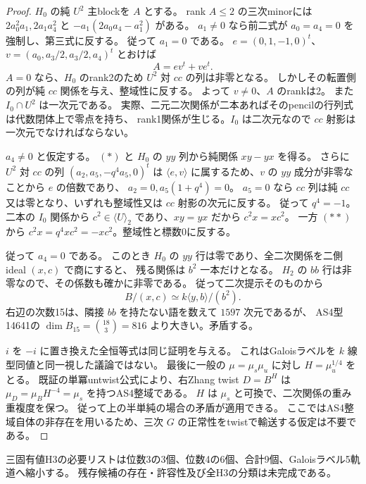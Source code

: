 \begin{proof}
$H_0$ の純 $U^2$ 主blockを $A$ とする。
rank $A\le2$ の三次minorには $2a_0^2a_1,2a_1a_4^2$ と
$-a_1(2a_0a_4-a_1^2)$ がある。
$a_1\ne0$ なら前二式が $a_0=a_4=0$ を強制し、第三式に反する。
従って $a_1=0$ である。
$e=(0,1,-1,0)^t$、$v=(a_0,a_3/2,a_3/2,a_4)^t$ とおけば
\[
 A=ev^t+ve^t.
\]
$A=0$ なら、$H_0$ のrank2のため $U^2$ 対 $cc$ の列は非零となる。
しかしその転置側の列が純 $cc$ 関係を与え、整域性に反する。
よって $v\ne0$、$A$ のrankは2。
また $I_0\cap U^2$ は一次元である。
実際、二元二次関係が二本あればそのpencilの行列式は代数閉体上で零点を持ち、
rank1関係が生じる。$I_0$ は二次元なので $cc$ 射影は一次元でなければならない。

$a_4\ne0$ と仮定する。
$(*)$ と $H_0$ の $yy$ 列から純関係 $xy-yx$ を得る。
さらに $U^2$ 対 $cc$ の列 $(a_2,a_5,-q^4a_5,0)^t$ は
$\langle e,v\rangle$ に属するため、$v$ の $yy$ 成分が非零なことから $e$ の倍数であり、
$a_2=0,a_5(1+q^4)=0$。
$a_5=0$ なら $cc$ 列は純 $cc$ 又は零となり、いずれも整域性又は $cc$ 射影の次元に反する。
従って $q^4=-1$。
二本の $I_0$ 関係から $c^2\in\langle U\rangle_2$ であり、$xy=yx$ だから $c^2x=xc^2$。
一方 $(**)$ から $c^2x=q^4xc^2=-xc^2$。整域性と標数0に反する。

従って $a_4=0$ である。
このとき $H_0$ の $yy$ 行は零であり、全二次関係を二側ideal $(x,c)$ で商にすると、
残る関係は $b^2$ 一本だけとなる。
$H_2$ の $bb$ 行は非零なので、その係数も確かに非零である。
従って二次提示そのものから
\[
 B/(x,c)\simeq k\langle y,b\rangle/(b^2).
\]
右辺の次数15は、隣接 $bb$ を持たない語を数えて $1597$ 次元であるが、
AS4型14641の $\dim B_{15}=\binom{18}{3}=816$ より大きい。矛盾する。

$i$ を $-i$ に置き換えた全恒等式は同じ証明を与える。
これはGaloisラベルを $k$ 線型同値と同一視した議論ではない。
最後に一般の $\mu=\mu_s\mu_u$ に対し $H=\mu_u^{1/4}$ をとる。
既証の単冪untwist公式により、右Zhang twist $D=B^H$ は
$\mu_D=\mu_BH^{-4}=\mu_s$ を持つAS4整域である。
$H$ は $\mu_s$ と可換で、二次関係の重み重複度を保つ。
従って上の半単純の場合の矛盾が適用できる。
ここではAS4整域自体の非存在を用いるため、三次 $G$ の正常性をtwistで輸送する仮定は不要である。
\end{proof}

\begin{corollary}[三固有値の九個の必要スペクトル]
\label{cor:cubic-three-eigenvalue-9-list}
三固有値H3の必要リストは位数3の3個、位数4の6個、合計9個、Galoisラベル5軌道へ縮小する。
残存候補の存在・許容性及び全H3の分類は未完成である。
\end{corollary}
